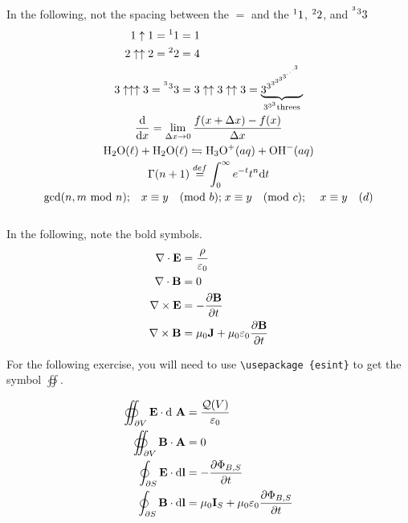\documentclass[a4paper]{article}
\newcommand{\ts}{\textsuperscript}
\begin{document}
	In the following, not the spacing between the $=$ and the
	${\ts 1} 1$, ${\ts 2} 2$, and ${\ts {\ts 3}} {\ts 3} 3$
	\begin{gather}
	\begin{split}
	1 \uparrow 1 = {\ts 1} 1 &= 1\\
	2 \uparrow \uparrow 2 = {\ts 2} 2 &= 4\\
	3 \uparrow \uparrow \uparrow 3 = {\ts {\ts 3}} {\ts 3} 3 &=
	3 \uparrow \uparrow 3 \uparrow \uparrow 3 =
	\underbrace{3 ^{3 ^{3 ^{3 ^{3 ^{3 ^{\cdot ^{ \cdot ^{\cdot ^{3}}}}}}}}}}
	_{3 ^{3 ^{3}} \text{threes}}
	\end{split}\\
	\frac{\text{d}}{\text{d}x} = \lim_{\Delta x \rightarrow 0}
	\frac{f(x + \Delta x) - f(x)}{\Delta x}\\
	\text{H}_2 \text{O}(\ell) + \text{H}_2 \text{O}(\ell)
	\leftrightharpoons \text{H}_3 \text{O} ^{+} (aq) +
	\text{OH} ^{-} (aq) \\
	\Gamma (n+1) \stackrel{def}{=} 
	\int_0 ^{\infty} e ^{-t}t ^n \text{d}t\\
	\text{$\gcd$($n, m$ mod $n$);} \quad x \equiv y \quad \text{(mod $b$);}
	\; x \equiv y \quad \text{(mod $c$); } \quad x \equiv y \quad (d)
	\end{gather}\\
	
	In the following, note the bold symbols.
	\begin{gather}
		\begin{split}
			\nabla \cdot \mathbf{E} &= \frac{\rho}{\varepsilon_0}\\
			\nabla \cdot \mathbf{B} &= 0\\
			\nabla \times \mathbf{E} &= 
			-\frac{\partial \mathbf{B}}{\partial t}\\
			\nabla \times \mathbf{B} &= \mu_0\text{\bf{J}} +
			\mu_0\varepsilon_0 \frac{\partial \mathbf{B}}{\partial t}
		\end{split}
	\end{gather}
	
	For the following exercise, you will need to use 
	\texttt{\textbackslash usepackage \{esint\}}
	to get the symbol $\oiint$.
	
	\begin{gather}
		\begin{split}
			\oiint_{\partial V} \mathbf{E} \cdot \text{d \bf{A}} &=
			\frac{\mathcal{Q}(V)}{\varepsilon_0}\\
			\oiint_{\partial V} \mathbf{B} \cdot \mathbf{A} &= 0\\
			\oint_{\partial S}  \mathbf{E}\cdot \text{d}\mathbf{l} &=
			-\frac{\partial \Phi_{B, S}}{\partial t}\\
			\oint_{\partial S} \mathbf{B} \cdot \text{d} \mathbf{l} &=
			\mu_0 {\mathbf{I}}_S + \mu_0 \varepsilon_0
			 \frac{\partial \Phi_{B, S}}{\partial t}
		\end{split}
	\end{gather}
	
\end{document}
